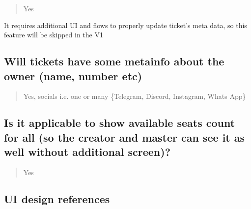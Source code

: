 \documentclass[11pt]{article}
\begin{document}
\begin{quote}
Yes
\end{quote}

It requires additional UI and flows to properly update ticket's meta data, so this feature will be skipped in the V1
\subsection{Will tickets have some metainfo about the owner (name, number etc)}
\label{sec:org1f5e285}

\begin{quote}
Yes, socials i.e. one or many \{Telegram, Discord, Instagram, Whats App\}
\end{quote}
\subsection{Is it applicable to show available seats count for all (so the creator and master can see it as well without additional screen)?}
\label{sec:orge87d6b0}

\begin{quote}
Yes
\end{quote}
\subsection{UI design references}
\label{sec:org0d78ade}
\end{document}
